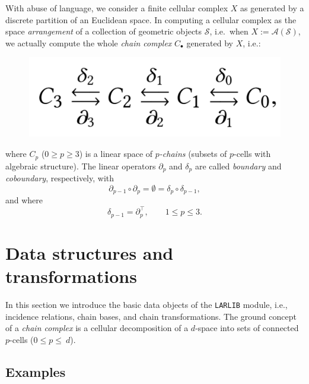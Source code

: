 With abuse of language, we consider a finite cellular complex $X$ as generated by a discrete partition of an Euclidean space. In computing a cellular complex as the space \emph{arrangement} of a collection of geometric objects $\mathcal{S}$, i.e.~when  $X := \mathcal{A}(\mathcal{S})$, we actually compute the whole \emph{chain complex} $C_\bullet$ generated by $X$, i.e.:
\begin{figure}[htbp] %
   \centering
   \includegraphics[width=0.30\linewidth]{img/chains} 
   \label{fig:chains}
\end{figure}
\vspace{-4mm}
\noindent
where $C_p$ ($0\geq p\geq 3$) is a linear space of \emph{$p$-chains} (subsets  of $p$-cells with algebraic structure).  The linear operators $\partial_p$ and $\delta_p$ are called \emph{boundary} and \emph{coboundary}, respectively, with 
\[
\partial_{p-1}\circ\partial_p  = \emptyset = \delta_{p}\circ\delta_{p-1} ,
\]
and where 
\[
\delta_{p-1} = \partial_p^\top, \qquad 1\leq p\leq 3.
\] 



\section{Data structures and transformations}
\label{sec:datastructures}



In this section we introduce the basic data objects of the \texttt{LARLIB} module,
i.e., incidence relations, chain bases, and chain transformations. The ground concept of a \emph{chain complex} is a cellular decomposition of a $d$-space into sets of connected $p$-cells ($0\leq p\leq\ d$). 



\subsection{Examples}
\label{sec:examples}

